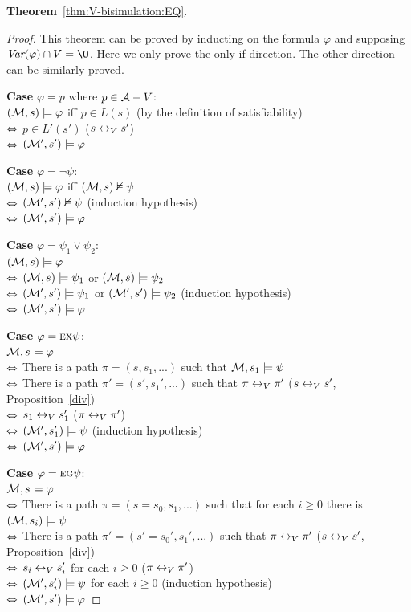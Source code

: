 \documentclass{article}
\begin{document}
\textbf{Theorem}~\ref{thm:V-bisimulation:EQ}.
\begin{proof}
This theorem can be proved by inducting on the formula $\varphi$ and supposing $\Var(\varphi) \cap V = \O$.
Here we only prove the only-if direction. The other direction can be similarly proved.

\textbf{Case} $\varphi = p$ where $p \in {\cal A} - V$:\\
$({\cal M}, s) \models \varphi$ iff $p\in L(s)$  \hfill  (by the definition of satisfiability) \\
$\Leftrightarrow$ $p \in L'(s')$ \hfill ($s \leftrightarrow_V s'$)\\
$\Leftrightarrow$ $({\cal M}', s') \models \varphi$

\textbf{Case} $\varphi = \neg \psi$:\\
$({\cal M}, s) \models \varphi$ iff $({\cal M}, s) \nvDash \psi$ \\
$\Leftrightarrow$ $({\cal M}', s') \nvDash \psi$  \hfill   (induction hypothesis)\\
$\Leftrightarrow$ $({\cal M}', s') \models \varphi$

\textbf{Case} $\varphi = \psi_1 \vee \psi_2$:\\
$({\cal M}, s) \models \varphi$\\
$\Leftrightarrow$ $({\cal M}, s) \models \psi_1$ or $({\cal M}, s) \models \psi_2$\\
$\Leftrightarrow$ $({\cal M}', s') \models \psi_1$ or $({\cal M}', s') \models \psi_2$   \hfill  (induction hypothesis)\\
$\Leftrightarrow$ $({\cal M}', s') \models \varphi$

\textbf{Case} $\varphi = \textsc{e} \textsc{x} \psi$:\\
${\cal M}, s \models \varphi$ \\
$\Leftrightarrow$ There is a path $\pi = (s, s_1, ...)$ such that ${\cal M}, s_1 \models \psi$\\
$\Leftrightarrow$ There is a path $\pi' = (s', s_1', ...)$ such that $\pi \leftrightarrow_V \pi'$ \hfill   ($s \leftrightarrow_V s'$, Proposition~\ref{div})\\
$\Leftrightarrow$ $s_1 \leftrightarrow_V s_1'$  \hfill ($\pi \leftrightarrow_V \pi'$)\\
$\Leftrightarrow$ $({\cal M}', s_1') \models \psi$  \hfill  (induction hypothesis)\\
$\Leftrightarrow$ $({\cal M}', s') \models \varphi$

\textbf{Case} $\varphi = \textsc{e} \textsc{g} \psi$:\\
${\cal M}, s \models \varphi$ \\
$\Leftrightarrow$ There is a path $\pi =(s=s_0, s_1, ...)$ such that for each $i \geq 0$ there is $({\cal M}, s_i) \models \psi$\\
$\Leftrightarrow$ There is a path $\pi' = (s'=s_0', s_1', ...)$ such that $\pi \leftrightarrow_V \pi'$   \hfill ($s \leftrightarrow_V s'$, Proposition~\ref{div})\\
$\Leftrightarrow$ $s_i \leftrightarrow_V s_i'$ for each $i \geq 0$ \hfill ($\pi \leftrightarrow_V \pi'$)\\
$\Leftrightarrow$ $({\cal M}', s_i') \models \psi$ for each $i \geq 0$  \hfill  (induction hypothesis)\\
$\Leftrightarrow$ $({\cal M}', s') \models \varphi$


\end{proof}
\end{document}
